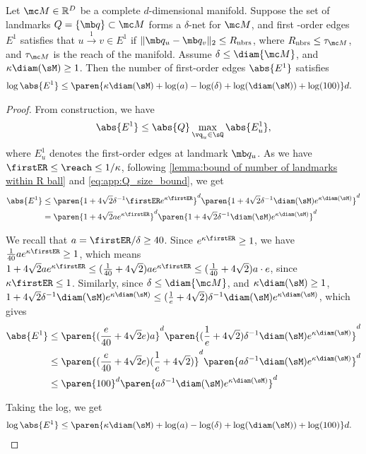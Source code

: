 \begin{lemma}\label{lem:app:foe_bound}

    Let $\mc M \in \mathbb{R}^D$ be a complete $d$-dimensional manifold. Suppose the set of landmarks $Q = \{\mb q\} \subset \mc M$ forms a $\delta$-net for $\mc M$, and first -order edges $E^1$ satisfies that $u \overset{1}{\rightarrow} v \in E^1$ if $\|\mb q_u - \mb q_v\|_2 \leq R_{\text{nbrs}}$, where $R_{\text{nbrs}} \leq \tau_{\mc M}$, and $\tau_{\mc M}$ is the reach of the manifold. Assume $\delta \leq \diam{\mc M}$, and  $\kappa \diam(\sM) \ge 1$. Then the number of first-order edges $\abs{E^1}$ satisfies
    \begin{align}
        \log \abs{E^1} &\le \paren{\kappa \diam(\sM) + \log(a) - \log(\delta) + \log(\diam(\sM)) + \log(100)}d. 
    \end{align}
\end{lemma}
\begin{proof}
From construction, we have 
\begin{align}
    \abs{E^1} \le \abs{Q} \max_{\vq_u \in \sQ}\abs{E_{u}^1},
\end{align} 
where $E^1_u$ denotes the first-order edges at landmark $\mb q_u$.
As we have $\firstER \le \reach \le 1/\kappa$, following \cref{lemma:bound of number of landmarks within R ball} and \cref{eq:app:Q_size_bound}, we get
\begin{align}
    \abs{E^1} 
    &\le \paren{1 + 4\sqrt{2}\delta^{-1} \firstER e^{\kappa \firstER} }^d \paren{1 + 4\sqrt{2}\delta^{-1} \diam(\sM) e^{\kappa \diam(\sM)} }^d \\
    &= \paren{1 + 4\sqrt{2}a e^{\kappa \firstER} }^d \paren{1 + 4\sqrt{2}\delta^{-1} \diam(\sM) e^{\kappa \diam(\sM)} }^d 
\end{align}



We recall that $a = \firstER / \delta \ge 40$. Since $e^{\kappa \firstER} \ge 1$, we have $\frac{1}{40} a e^{\kappa \firstER} \ge 1$, which means  $1 + 4\sqrt{2}a e^{\kappa \firstER} \le (\frac{1}{40} + 4\sqrt{2})a e^{\kappa \firstER} \le (\frac{1}{40} + 4\sqrt{2})a\cdot e$, since $\kappa \firstER \le 1$. Similarly, since $\delta \leq \diam{\mc M}$, and $\kappa \diam(\sM) \ge 1$, $1 + 4\sqrt{2}\delta^{-1} \diam(\sM) e^{\kappa \diam(\sM)} \le (\frac{1}{e} + 4\sqrt{2})\delta^{-1} \diam(\sM) e^{\kappa \diam(\sM)}$, which gives 
\begin{align}
    \abs{E^1} 
    &\le\paren{(\frac{e}{40} + 4\sqrt{2}e)a}^d \paren{(\frac{1}{e} + 4\sqrt{2})\delta^{-1} \diam(\sM) e^{\kappa \diam(\sM)}}^d \\ 
    &\le\paren{(\frac{e}{40} + 4\sqrt{2}e)(\frac{1}{e} + 4\sqrt{2})}^d \paren{a\delta^{-1} \diam(\sM) e^{\kappa \diam(\sM)}}^d \\
    &\le\paren{100}^d \paren{a\delta^{-1} \diam(\sM) e^{\kappa \diam(\sM)}}^d
\end{align}

Taking the log,  we get
\begin{align}
    \log \abs{E^1} &  \le \paren{\kappa \diam(\sM) + \log(a) - \log(\delta) + \log(\diam(\sM)) + \log(100)}d.    
\end{align}  


\end{proof}
